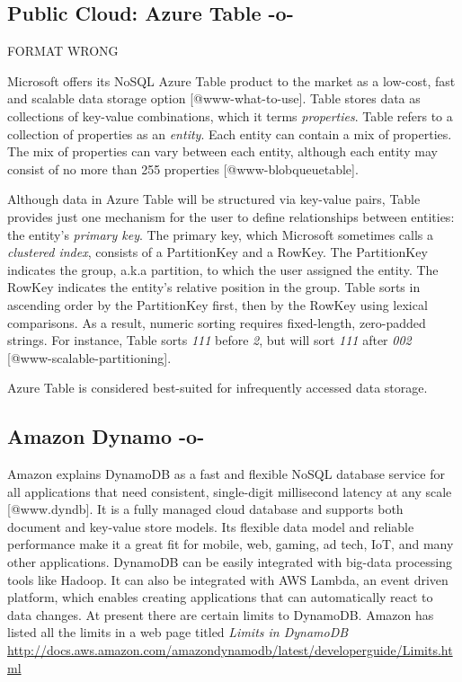      
\subsection{Public Cloud: Azure Table -o-}

     FORMAT WRONG

Microsoft offers its NoSQL Azure Table product to the market as a
low-cost, fast and scalable data storage option
[@www-what-to-use]. Table stores data as collections of
key-value combinations, which it terms \textit{properties}.  Table
refers to a collection of properties as an \textit{entity}.  Each
entity can contain a mix of properties.  The mix of properties can
vary between each entity, although each entity may consist of no more
than 255 properties [@www-blobqueuetable].

Although data in Azure Table will be structured via key-value pairs,
Table provides just one mechanism for the user to define relationships
between entities: the entity's \textit{primary key}.  The primary key,
which Microsoft sometimes calls a \textit{clustered index}, consists
of a PartitionKey and a RowKey.  The PartitionKey indicates the group,
a.k.a partition, to which the user assigned the entity.  The RowKey
indicates the entity's relative position in the group.  Table sorts in
ascending order by the PartitionKey first, then by the RowKey using
lexical comparisons.  As a result, numeric sorting requires
fixed-length, zero-padded strings.  For instance, Table sorts
\textit{111} before \textit{2}, but will sort \textit{111} after
\textit{002} [@www-scalable-partitioning].

Azure Table is considered best-suited for infrequently accessed data
storage.



\subsection{Amazon Dynamo -o-}

Amazon explains DynamoDB as a fast and flexible NoSQL database service
for all applications that need consistent, single-digit millisecond
latency at any scale [@www.dyndb].  It is a fully managed cloud
database and supports both document and key-value store models.  Its
flexible data model and reliable performance make it a great fit for
mobile, web, gaming, ad tech, IoT, and many other applications.
DynamoDB can be easily integrated with big-data processing tools like
Hadoop. It can also be integrated with AWS Lambda, an event driven
platform, which enables creating applications that can automatically
react to data changes. At present there are certain limits to
DynamoDB. Amazon has listed all the limits in a web page titled
\textit{Limits in DynamoDB }
\url{http://docs.aws.amazon.com/amazondynamodb/latest/developerguide/Limits.html}




